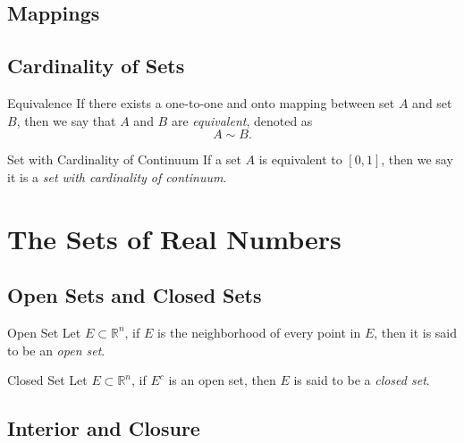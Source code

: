 \subsection{Mappings}



\subsection{Cardinality of Sets}

\begin{definition}{Equivalence}{}
  If there exists a one-to-one and onto mapping between set $A$ and set $B$,
  then we say that $A$ and $B$ are \emph{equivalent}, denoted as
  \begin{equation}
    A \sim B.
  \end{equation}
\end{definition}

\begin{definition}{Set with Cardinality of Continuum}{}
  If a set $A$ is equivalent to $[0, 1]$,
  then we say it is a \emph{set with cardinality of continuum}.
\end{definition}

\section{The Sets of Real Numbers}

\subsection{Open Sets and Closed Sets}

\begin{definition}{Open Set}{}
  Let $E \subset \mathbb{R}^n$, if $E$ is the neighborhood of every point in
  $E$,
  then it is said to be an \emph{open set}.
\end{definition}

\begin{definition}{Closed Set}{}
  Let $E \subset \mathbb{R}^n$, if $E^c$ is an open set,
  then $E$ is said to be a \emph{closed set}.
\end{definition}

\subsection{Interior and Closure}





